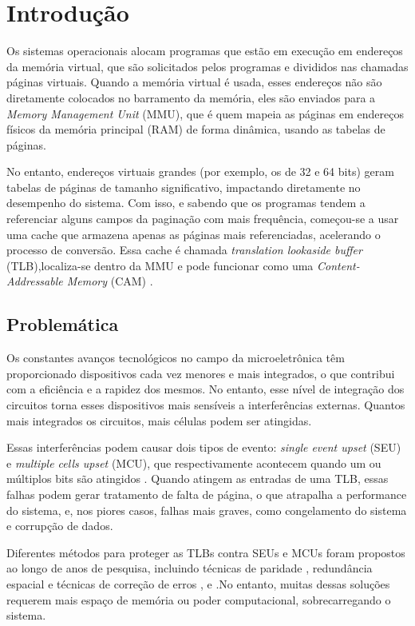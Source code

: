 \chapter{Introdução}\label{cap:introducao}
Os sistemas operacionais alocam programas que estão em execução em endereços
da memória virtual, que são solicitados pelos programas e divididos nas chamadas páginas
virtuais. Quando a memória virtual é usada, esses endereços não são
diretamente colocados no barramento da memória, eles são enviados para a \textit{Memory
Management Unit} (MMU), que é quem mapeia as páginas em endereços físicos da memória principal (RAM) de forma dinâmica, usando as tabelas de páginas.

No entanto, endereços virtuais grandes (por exemplo, os de 32 e 64 bits)
geram tabelas de páginas de tamanho significativo, impactando diretamente no
desempenho do sistema. Com isso, e sabendo que os programas tendem a referenciar alguns campos da paginação com mais frequência, começou-se a usar uma cache que armazena apenas as páginas mais referenciadas, acelerando o processo de conversão. Essa cache é chamada \textit{translation lookaside buffer} (TLB),localiza-se dentro da MMU e pode funcionar como uma \textit{Content-Addressable Memory} (CAM) \cite{griffith2005tlb}.

\section{Problemática}

Os constantes avanços tecnológicos no campo da microeletrônica têm proporcionado dispositivos cada vez menores e mais integrados, o que contribui com a eficiência e a rapidez dos mesmos. No entanto, esse nível de integração dos circuitos torna esses dispositivos mais sensíveis a interferências externas. Quantos mais integrados os circuitos, mais células podem ser atingidas.

Essas interferências podem causar dois tipos de evento: \textit{single event upset} (SEU) e \textit{multiple cells upset} (MCU), que respectivamente acontecem quando um ou múltiplos bits são atingidos \cite{chugg2004broadening}. Quando atingem as entradas de uma TLB, essas falhas podem gerar tratamento de falta de página, o que atrapalha a performance do sistema, e, nos piores casos, falhas mais graves, como congelamento do sistema e corrupção de dados.

Diferentes métodos para proteger as TLBs contra SEUs e MCUs foram propostos ao longo de anos de pesquisa, incluindo técnicas de paridade \cite{griffith2005tlb}, redundância espacial \cite{lang2013processor} e técnicas de correção de erros \cite{sanchez2016combined}, \cite{pagiamtzis2006soft} e \cite{sanchez2012hamming}.No entanto, muitas dessas soluções requerem mais espaço de memória ou poder computacional, sobrecarregando o sistema.

